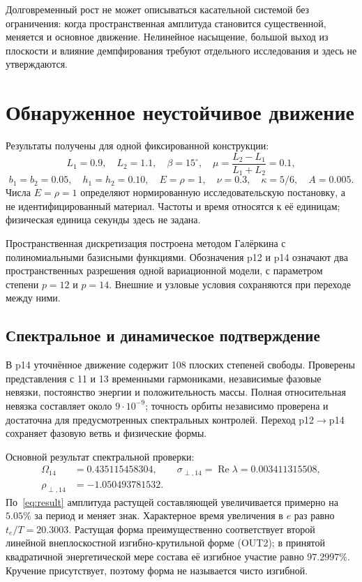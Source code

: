 \documentclass[11pt,a4paper]{article}
\begin{document}
Долговременный рост не может описываться касательной системой без ограничения: когда пространственная амплитуда становится существенной, меняется и основное движение. Нелинейное насыщение, большой выход из плоскости и влияние демпфирования требуют отдельного исследования и здесь не утверждаются.

\section{Обнаруженное неустойчивое движение}
Результаты получены для одной фиксированной конструкции:
\[
L_1=0.9,\quad L_2=1.1,\quad \beta=15^\circ,\quad
\mu=\frac{L_2-L_1}{L_1+L_2}=0.1,
\]
\[
b_1=b_2=0.05,\quad h_1=h_2=0.10,\quad
E=\rho=1,\quad \nu=0.3,\quad\kappa=5/6,\quad A=0.005.
\]
Числа $E=\rho=1$ определяют нормированную исследовательскую постановку, а не идентифицированный материал. Частоты и время относятся к её единицам; физическая единица секунды здесь не задана.

Пространственная дискретизация построена методом Галёркина с полиномиальными базисными функциями. Обозначения p12 и p14 означают два пространственных разрешения одной вариационной модели, с параметром степени $p=12$ и $p=14$. Внешние и узловые условия сохраняются при переходе между ними.

\subsection{Спектральное и динамическое подтверждение}
В p14 уточнённое движение содержит 108 плоских степеней свободы. Проверены представления с 11 и 13 временными гармониками, независимые фазовые невязки, постоянство энергии и положительность массы. Полная относительная невязка составляет около $9\cdot10^{-9}$; точность орбиты независимо проверена и достаточна для предусмотренных спектральных контролей. Переход p12$\to$p14 сохраняет фазовую ветвь и физические формы.

Основной результат спектральной проверки:
\begin{equation}
\begin{aligned}
\Omega_{14}&=0.435115458304,\qquad
\sigma_{\perp,14}=\operatorname{Re}\lambda=0.003411315508,\\
\rho_{\perp,14}&=-1.050493781532.
\end{aligned}
\label{eq:result}
\end{equation}
По~\eqref{eq:result} амплитуда растущей составляющей увеличивается примерно на $5.05\%$ за период и меняет знак. Характерное время увеличения в $e$ раз равно $t_e/T=20.3003$. Растущая форма преимущественно соответствует второй линейной внеплоскостной изгибно-крутильной форме (OUT2); в принятой квадратичной энергетической мере состава её изгибное участие равно $97.2997\%$. Кручение присутствует, поэтому форма не называется чисто изгибной.
\end{document}
